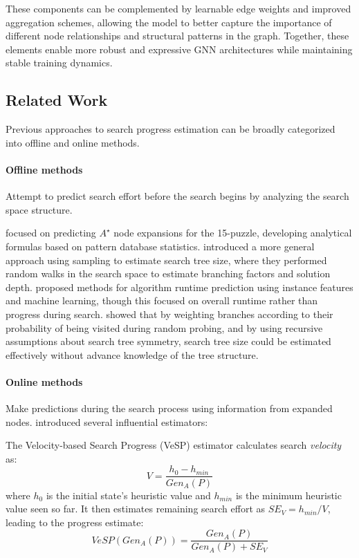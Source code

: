 \documentclass[letterpaper]{article}
\newcommand{\gur}[1]{{\color{teal}{Gur: #1}}}
\begin{document}
These components can be complemented by learnable edge weights and improved aggregation schemes, allowing the model to better capture the importance of different node relationships and structural patterns in the graph. Together, these elements enable more robust and expressive GNN architectures while maintaining stable training dynamics.


\subsection{Related Work}

Previous approaches to search progress estimation can be broadly categorized into offline and online methods.

\gur{The partition here is off, a lot of the 'offline' methods are online.}

\paragraph{Offline methods} Attempt to predict search effort before the search begins by analyzing the search space structure.

\citet{breyer2008recent} focused on predicting $A^{\star}$ node expansions for the 15-puzzle, developing analytical formulas based on pattern database statistics.
\citet{lelis2014estimating} introduced a more general approach using sampling to estimate search tree size, where they performed random walks in the search space to estimate branching factors and solution depth. \citet{hutter2014algorithm} proposed methods for algorithm runtime prediction using instance features and machine learning, though this focused on overall runtime rather than progress during search. \citet{kilby2006estimating} showed that by weighting branches according to their probability of being visited during random probing, and by using recursive assumptions about search tree symmetry, search tree size could be estimated effectively without advance knowledge of the tree structure.

\paragraph{Online methods} Make predictions during the search process using information from expanded nodes. \citet{thayer2012we} introduced several influential estimators:

The Velocity-based Search Progress (VeSP) estimator calculates search \emph{velocity} as:
\begin{equation*}
    V = \frac{h_0 - h_{min}}{Gen_A(P)}
\end{equation*}
where $h_0$ is the initial state's heuristic value and $h_{min}$ is the minimum heuristic value seen so far. It then estimates remaining search effort as $SE_V = h_{min}/V$, leading to the progress estimate:
\begin{equation}
    VeSP(Gen_A(P)) = \frac{Gen_A(P)}{Gen_A(P) + SE_V}
\end{equation}
\end{document}
